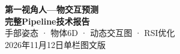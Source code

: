 \documentclass[10pt,a4paper,UTF8,fontset=fandol]{ctexart}
\begin{document}
\begin{center}
{\LARGE\bfseries 第一视角人—物交互预测}\\[7pt]
{\Large\bfseries 完整Pipeline技术报告}\\[8pt]
{\normalsize 手部姿态 · 物体6D · 动态交互图 · RSI优化}\\[5pt]
{\small 2026年11月12日\quad 单栏图文版}
\end{center}
\end{document}
